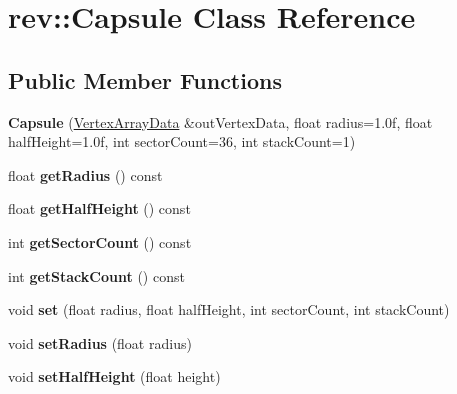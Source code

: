 \hypertarget{classrev_1_1_capsule}{}\section{rev\+::Capsule Class Reference}
\label{classrev_1_1_capsule}
\subsection*{Public Member Functions}
\begin{DoxyCompactItemize}
\item 
\mbox{\label{classrev_1_1_capsule_ae39e8ba7bb576e6c37404a1a7bf91012}} 
{\bfseries Capsule} (\mbox{\hyperlink{classrev_1_1_vertex_array_data}{Vertex\+Array\+Data}} \&out\+Vertex\+Data, float radius=1.\+0f, float half\+Height=1.\+0f, int sector\+Count=36, int stack\+Count=1)
\item 
\mbox{\label{classrev_1_1_capsule_a6b86f1038690888de07844093272aa20}} 
float {\bfseries get\+Radius} () const
\item 
\mbox{\label{classrev_1_1_capsule_a5e9d240bccce90d4728f61fc236f844e}} 
float {\bfseries get\+Half\+Height} () const
\item 
\mbox{\label{classrev_1_1_capsule_a0bcb5b3438568621eedeaef43ffe83c0}} 
int {\bfseries get\+Sector\+Count} () const
\item 
\mbox{\label{classrev_1_1_capsule_a8c9186561b95b762b0bba493fec1d678}} 
int {\bfseries get\+Stack\+Count} () const
\item 
\mbox{\label{classrev_1_1_capsule_afb50506905d5d813b3349ded80deecf5}} 
void {\bfseries set} (float radius, float half\+Height, int sector\+Count, int stack\+Count)
\item 
\mbox{\label{classrev_1_1_capsule_a708d77e1966a8163ed6718c57129fc11}} 
void {\bfseries set\+Radius} (float radius)
\item 
\mbox{\label{classrev_1_1_capsule_a14a1a4acec613061c18e1b46717f70cb}} 
void {\bfseries set\+Half\+Height} (float height)

\end{DoxyCompactItemize}
